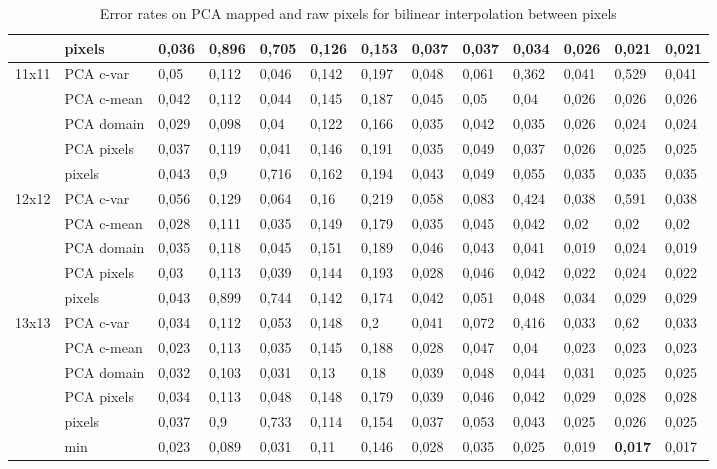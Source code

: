 \documentclass{article}
\begin{document}
\begin{table}[H]
\begin{tabular}{l|l|llllllllll|l|}
          & pixels & 0,036 & 0,896 & 0,705 & 0,126 & 0,153 & 0,037 & 0,037 & 0,034 & 0,026 & 0,021 & 0,021 \\ \hline
    11x11 & PCA c-var & 0,05  & 0,112 & 0,046 & 0,142 & 0,197 & 0,048 & 0,061 & 0,362 & 0,041 & 0,529 & 0,041 \\
          & PCA c-mean & 0,042 & 0,112 & 0,044 & 0,145 & 0,187 & 0,045 & 0,05  & 0,04  & 0,026 & 0,026 & 0,026 \\
          & PCA domain & 0,029 & 0,098 & 0,04  & 0,122 & 0,166 & 0,035 & 0,042 & 0,035 & 0,026 & 0,024 & 0,024 \\
          & PCA pixels & 0,037 & 0,119 & 0,041 & 0,146 & 0,191 & 0,035 & 0,049 & 0,037 & 0,026 & 0,025 & 0,025 \\
          & pixels & 0,043 & 0,9   & 0,716 & 0,162 & 0,194 & 0,043 & 0,049 & 0,055 & 0,035 & 0,035 & 0,035 \\ \hline
    12x12 & PCA c-var & 0,056 & 0,129 & 0,064 & 0,16  & 0,219 & 0,058 & 0,083 & 0,424 & 0,038 & 0,591 & 0,038 \\
          & PCA c-mean & 0,028 & 0,111 & 0,035 & 0,149 & 0,179 & 0,035 & 0,045 & 0,042 & 0,02  & 0,02  & 0,02 \\
          & PCA domain & 0,035 & 0,118 & 0,045 & 0,151 & 0,189 & 0,046 & 0,043 & 0,041 & 0,019 & 0,024 & 0,019 \\
          & PCA pixels & 0,03  & 0,113 & 0,039 & 0,144 & 0,193 & 0,028 & 0,046 & 0,042 & 0,022 & 0,024 & 0,022 \\
          & pixels & 0,043 & 0,899 & 0,744 & 0,142 & 0,174 & 0,042 & 0,051 & 0,048 & 0,034 & 0,029 & 0,029 \\ \hline
    13x13 & PCA c-var & 0,034 & 0,112 & 0,053 & 0,148 & 0,2   & 0,041 & 0,072 & 0,416 & 0,033 & 0,62  & 0,033 \\
          & PCA c-mean & 0,023 & 0,113 & 0,035 & 0,145 & 0,188 & 0,028 & 0,047 & 0,04  & 0,023 & 0,023 & 0,023 \\
          & PCA domain & 0,032 & 0,103 & 0,031 & 0,13  & 0,18  & 0,039 & 0,048 & 0,044 & 0,031 & 0,025 & 0,025 \\
          & PCA pixels & 0,034 & 0,113 & 0,048 & 0,148 & 0,179 & 0,039 & 0,046 & 0,042 & 0,029 & 0,028 & 0,028 \\
          & pixels & 0,037 & 0,9   & 0,733 & 0,114 & 0,154 & 0,037 & 0,053 & 0,043 & 0,025 & 0,026 & 0,025 \\ \hline
          & min   & 0,023 & 0,089 & 0,031 & 0,11  & 0,146 & 0,028 & 0,035 & 0,025 & 0,019 & \textbf{0,017} & 0,017 \\
    \hline
    \end{tabular}%
		  \caption{Error rates on PCA mapped and raw pixels for bilinear interpolation between pixels}   \label{table: errorrates of PCA mappings bilinear}%
\end{table}%




\nocite{*}

\end{document}
